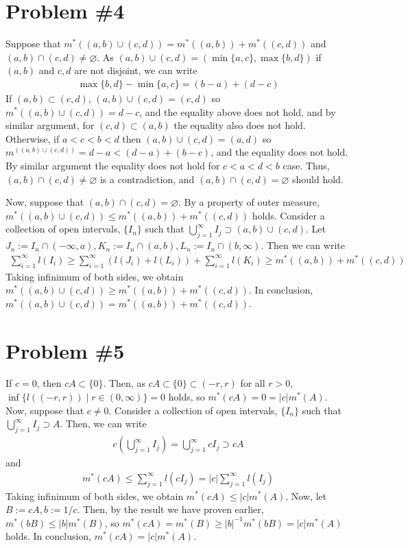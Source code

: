 \documentclass{scrartcl}
\begin{document}
\section{Problem \#4}
Suppose that \(m^*((a, b) \cup (c, d)) = m^*((a, b)) + m^*((c, d))\) and \((a,
b) \cap (c, d) \not = \varnothing\). As \((a, b) \cup (c, d) = (\min \{a, c\},
\max \{b, d\})\) if \((a, b)\) and \(c, d\) are not disjoint, we can write
\begin{align*}
  \max \{b, d\} - \min \{a, c\}
  = (b - a) + (d - c)
\end{align*}
If \((a, b) \subset (c, d)\), \((a, b) \cup (c, d) = (c, d)\) so \(m^*((a, b)
\cup (c, d)) = d - c\), and the equality above does not hold, and by similar
argument, for \((c, d) \subset (a, b)\) the equality also does not hold.
Otherwise, if \(a < c < b < d\) then \((a, b) \cup (c, d) = (a, d)\) so
\(m^((a, b) \cup (c, d)) = d - a < (d - a) + (b - c)\), and the equality does
not hold. By similar argument the equality does not hold for \(c < a < d < b\)
case. Thus, \((a, b) \cap (c, d) \not = \varnothing\) is a contradiction, and
\((a, b) \cap (c, d) = \varnothing\) should hold.

Now, suppose that \((a, b) \cap (c, d) = \varnothing\). By a property of outer
measure, \(m^*((a, b) \cup (c, d)) \le m^*((a, b)) + m^*((c, d))\) holds.
Consider a collection of open intervals, \(\{I_n\}\) such that
\(\bigcup^\infty_{j = 1} I_j \supset (a, b) \cup (c, d)\). Let \(J_n := I_n
\cap (-\infty, a), K_n := I_n \cap (a, b), L_n := I_n \cap (b, \infty)\). Then
we can write
\begin{align*}
  \sum^\infty_{i = 1} l(I_i)
  \ge \sum^\infty_{i = 1} (l(J_i) + l(L_i)) + \sum^\infty_{i = 1} l(K_i)
  \ge m^*((a, b)) + m^*((c, d))
\end{align*}
Taking infinimum of both sides, we obtain \(m^*((a, b) \cup (c, d)) \ge m^*((a,
b)) + m^*((c, d))\). In conclusion, \(m^*((a, b) \cup (c, d)) = m^*((a, b)) +
m^*((c, d))\).

\section{Problem \#5}
If \(c = 0\), then \(cA \subset \{0\}\). Then, as \(cA \subset \{0\} \subset
(-r, r)\) for all \(r > 0\), \(\inf \{l((-r, r))\; |\; r \in (0, \infty)\} =
0\) holds, so \(m^*(cA) = 0 = |c| m^*(A)\). Now, suppose that \(c \not = 0\).
Consider a collection of open intervals, \(\{I_n\}\) such that
\(\bigcup^\infty_{j = 1} I_j \supset A\). Then, we can write
\begin{align*}
  c \left( \bigcup^\infty_{j = 1} I_j \right)
  = \bigcup^\infty_{j = 1} cI_j
  \supset cA
\end{align*}
and
\begin{align*}
  m^*(cA)
  \le \sum^\infty_{j = 1} l(cI_j)
  = |c| \sum^\infty_{j = 1} l(I_j)
\end{align*}
Taking infinimum of both sides, we obtain \(m^*(cA) \le |c| m^*(A)\). Now, let
\(B := cA, b := 1 / c\). Then, by the result we have proven earlier, \(m^*(bB)
\le |b| m^*(B)\), so \(m^*(cA) = m^*(B) \ge |b|^{-1} m^*(bB) = |c| m^*(A)\)
holds. In conclusion, \(m^*(cA) = |c| m^*(A)\).
\end{document}

